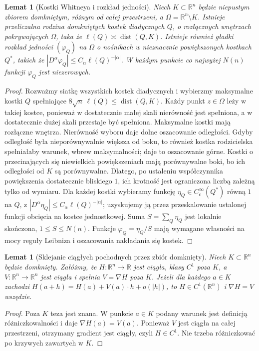 \documentclass[11pt,a4paper,oneside]{book}
\numberwithin{equation}{chapter}
\theoremstyle{plain}
\newtheorem{lemat}[twierdzenie]{Lemat}
\theoremstyle{definition}
\theoremstyle{remark}
\begin{document}
\begin{lemat}[Kostki Whitneya i rozkład jedności]
\label{lem:dzety-whitney-cubes}
Niech $K\subset\mathbb R^n$ będzie niepustym zbiorem
domkniętym, różnym od całej przestrzeni, a
$\Omega=\mathbb R^n\setminus K$. Istnieje przeliczalna
rodzina domkniętych kostek diadycznych $Q$, o rozłącznych
wnętrzach pokrywających $\Omega$, taka że
$\ell(Q)\asymp\operatorname{dist}(Q,K)$. Istnieje
również gładki rozkład jedności $(\varphi_Q)$ na $\Omega$
o nośnikach w nieznacznie powiększonych kostkach $Q^*$,
takich że
$|D^\alpha\varphi_Q|\le C_\alpha\ell(Q)^{-|\alpha|}$.
W każdym punkcie co najwyżej $N(n)$ funkcji
$\varphi_Q$ jest niezerowych.
\end{lemat}
\begin{proof}
Rozważmy siatkę wszystkich kostek diadycznych i wybierzmy
maksymalne kostki $Q$ spełniające
$8\sqrt n\,\ell(Q)\le\operatorname{dist}(Q,K)$.
Każdy punkt $z\in\Omega$ leży w takiej kostce, ponieważ
w dostatecznie małej skali nierówność jest spełniona,
a w dostatecznie dużej skali przestaje być spełniona.
Maksymalne kostki mają rozłączne wnętrza.
Nierówność wyboru daje dolne oszacowanie odległości.
Gdyby odległość była nieporównywalnie większa od boku,
to również kostka rodzicielska spełniałaby warunek,
wbrew maksymalności; daje to oszacowanie górne.
Kostki o przecinających się niewielkich powiększeniach
mają porównywalne boki, bo ich odległości od $K$
są porównywalne. Dlatego, po ustaleniu współczynnika
powiększenia dostatecznie bliskiego $1$, ich krotność
jest ograniczona liczbą zależną tylko od wymiaru.
Dla każdej kostki wybieramy funkcję $\eta_Q\in C_c^\infty(Q^*)$
równą $1$ na $Q$, z
$|D^\alpha\eta_Q|\le C_\alpha\ell(Q)^{-|\alpha|}$;
uzyskujemy ją przez przeskalowanie ustalonej funkcji
obcięcia na kostce jednostkowej. Suma
$S=\sum_Q\eta_Q$ jest lokalnie skończona,
$1\le S\le N(n)$. Funkcje
$\varphi_Q=\eta_Q/S$ mają wymagane własności
na mocy reguły Leibniza i oszacowania nakładania się
kostek.
\end{proof}

\begin{lemat}[Sklejanie ciągłych pochodnych przez zbiór domknięty]
\label{lem:dzety-glue}
Niech $K\subset\mathbb R^n$ będzie domknięty. Załóżmy, że
$H:\mathbb R^n\to\mathbb R$ jest ciągła, klasy $C^1$ poza $K$,
a $V:\mathbb R^n\to\mathbb R^n$ jest ciągła i spełnia
$V=\nabla H$ poza $K$. Jeżeli dla każdego $a\in K$
zachodzi $H(a+h)=H(a)+V(a)\cdot h+o(|h|)$, to
$H\in C^1(\mathbb R^n)$ i $\nabla H=V$ wszędzie.
\end{lemat}
\begin{proof}
Poza $K$ teza jest znana. W punkcie $a\in K$ podany
warunek jest definicją różniczkowalności i daje
$\nabla H(a)=V(a)$. Ponieważ $V$ jest ciągła na całej
przestrzeni, otrzymany gradient jest ciągły, czyli
$H\in C^1$. Nie trzeba różniczkować po krzywych
zawartych w $K$.
\end{proof}
\end{document}
